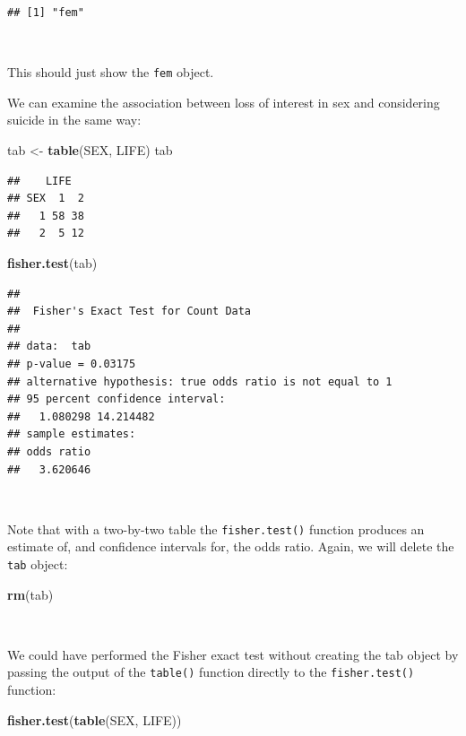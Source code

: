 \documentclass[12pt,a4paper]{book}
\newenvironment{Shaded}{\begin{snugshade}}{\end{snugshade}}
\newcommand{\KeywordTok}[1]{\textcolor[rgb]{0.13,0.29,0.53}{\textbf{#1}}}
\newcommand{\StringTok}[1]{\textcolor[rgb]{0.31,0.60,0.02}{#1}}
\newcommand{\NormalTok}[1]{#1}
\theoremstyle{definition}
\theoremstyle{definition}
\theoremstyle{definition}
\theoremstyle{remark}
\begin{document}
\begin{verbatim}
## [1] "fem"
\end{verbatim}

~

This should just show the \texttt{fem} object.

We can examine the association between loss of interest in sex and
considering suicide in the same way:

\begin{Shaded}
\begin{Highlighting}[]
\NormalTok{tab <-}\StringTok{ }\KeywordTok{table}\NormalTok{(SEX, LIFE)}
\NormalTok{tab}
\end{Highlighting}
\end{Shaded}

\begin{verbatim}
##    LIFE
## SEX  1  2
##   1 58 38
##   2  5 12
\end{verbatim}

\begin{Shaded}
\begin{Highlighting}[]
\KeywordTok{fisher.test}\NormalTok{(tab)}
\end{Highlighting}
\end{Shaded}

\begin{verbatim}
## 
##  Fisher's Exact Test for Count Data
## 
## data:  tab
## p-value = 0.03175
## alternative hypothesis: true odds ratio is not equal to 1
## 95 percent confidence interval:
##   1.080298 14.214482
## sample estimates:
## odds ratio 
##   3.620646
\end{verbatim}

~

Note that with a two-by-two table the \texttt{fisher.test()} function
produces an estimate of, and confidence intervals for, the odds ratio.
Again, we will delete the \texttt{tab} object:

\begin{Shaded}
\begin{Highlighting}[]
\KeywordTok{rm}\NormalTok{(tab)}
\end{Highlighting}
\end{Shaded}

~

We could have performed the Fisher exact test without creating the tab
object by passing the output of the \texttt{table()} function directly
to the \texttt{fisher.test()} function:

\begin{Shaded}
\begin{Highlighting}[]
\KeywordTok{fisher.test}\NormalTok{(}\KeywordTok{table}\NormalTok{(SEX, LIFE))}
\end{Highlighting}
\end{Shaded}
\end{document}
